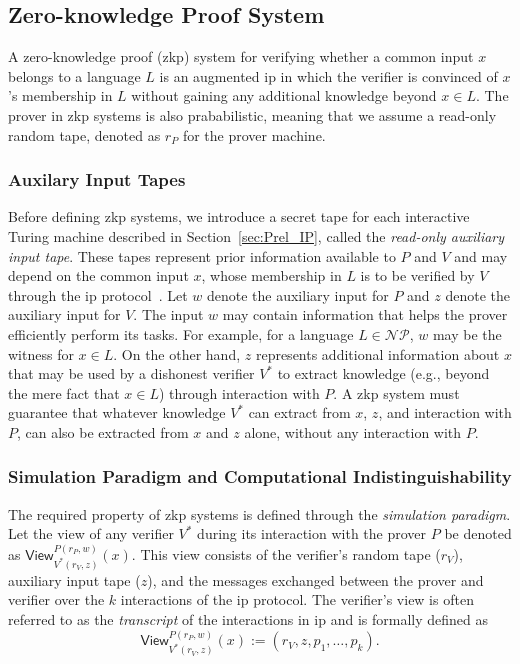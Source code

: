 \subsection{Zero-knowledge Proof System}

A zero-knowledge proof (\gls{zkp}) system for verifying whether a common input \( x \) belongs to a language \( L \) is an augmented \gls{ip} in which the verifier is convinced of \( x \)'s membership in \( L \) without gaining any additional knowledge beyond \( x \in L \). The prover in \gls{zkp} systems is also prababilistic, meaning that we assume a read-only random tape, denoted as $r_P$ for the prover machine. 

\subsubsection{Auxilary Input Tapes}
Before defining \gls{zkp} systems, we introduce a secret tape for each interactive Turing machine described in Section~\ref{sec:Prel_IP}, called the \textit{read-only auxiliary input tape}. These tapes represent prior information available to \( P \) and \( V \) and may depend on the common input \( x \), whose membership in \( L \) is to be verified by \( V \) through the \gls{ip} protocol~\cite{Goldreich2001Book}. Let \( w \) denote the auxiliary input for \( P \) and \( z \) denote the auxiliary input for \( V \). The input \( w \) may contain information that helps the prover efficiently perform its tasks. For example, for a language \( L \in \mathcal{NP} \), \( w \) may be the witness for \( x \in L \). 
On the other hand, \( z \) represents additional information about \( x \) that may be used by a dishonest verifier \( V^* \) to extract knowledge (e.g., beyond the mere fact that \( x \in L \)) through interaction with \( P \). A \gls{zkp} system must guarantee that whatever knowledge \( V^* \) can extract from \( x \), \( z \), and interaction with \( P \), can also be extracted from \( x \) and \( z \) alone, without any interaction with \( P \).  

\subsubsection{Simulation Paradigm and Computational Indistinguishability}  
The required property of \gls{zkp} systems is defined through the \textit{simulation paradigm}. Let the view of any verifier $V^*$ during its interaction with the prover $P$ be denoted as  
\(
\textsf{View}_{V^*(r_V, z)}^{P(r_P, w)}(x).
\)
This view consists of the verifier's random tape ($r_V$), auxiliary input tape ($z$), and the messages exchanged between the prover and verifier over the $k$ interactions of the \gls{ip} protocol. The verifier's view is often referred to as the \textit{transcript} of the interactions in \gls{ip} and is formally defined as  
\[
\textsf{View}_{V^*(r_V, z)}^{P(r_P, w)}(x) := (r_V, z, p_1, \dots, p_k).
\]  

